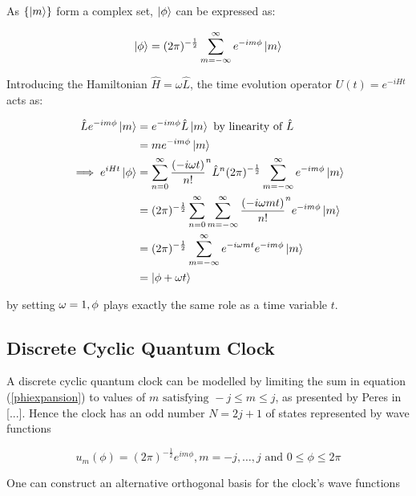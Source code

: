 \documentclass{article}
\begin{document}
\noindent As $\{\ket{m}\}$ form a complex set, $\ket{\phi}$ can be expressed as:

\begin{equation}
	\ket{\phi} = (2\pi)^{-\frac{1}{2}}\sum_{m=-\infty}^{\infty}e^{-im\phi}\ket{m}
	\label{phiexpansion}
\end{equation}

\noindent Introducing the Hamiltonian $\hat{H}=\omega \hat{L}$, the time evolution operator $U(t) = e^{-iHt}$ acts as:

\begin{align}
\hat{L}e^{-im\phi}\ket{m} &= e^{-im\phi}\hat{L}\ket{m} \text{ by linearity of } \hat{L} \\
				  &= me^{-im\phi}\ket{m} \\
\implies e^{iHt}\ket{\phi} &= \sum_{n=0}^{\infty}\frac{(-i\omega t)}{n!}^n \hat{L}^n (2\pi)^{-\frac{1}{2}}\sum_{m=-\infty}^{\infty}e^{-im\phi}\ket{m} \\
			   &= (2\pi)^{-\frac{1}{2}}\sum_{n=0}^{\infty}\sum_{m=-\infty}^{\infty} \frac{(-i\omega mt)}{n!}^n e^{-im\phi} \ket{m} \\
				   &= (2\pi)^{-\frac{1}{2}}\sum_{m=-\infty}^{\infty}e^{-i\omega mt}e^{-im\phi}\ket{m} \\
				   &= \ket{\phi+\omega t}
\end{align}

\noindent by setting $\omega = 1, \space \phi$ plays exactly the same role as a time variable $t$.

\subsection{Discrete Cyclic Quantum Clock}
\label{subsection:dcqc}
A discrete cyclic quantum clock can be modelled by limiting the sum in equation (\ref{phiexpansion}) to values of \linebreak $m \text{ satisfying } -j \leq m \leq j$, as presented by Peres in [...]. Hence the clock has an odd number $N = 2j+1$ of states represented by wave functions

\begin{equation}
	u_m(\phi) = (2\pi)^{-\frac{1}{2}}e^{im\phi}, m = -j,\dots, j \text{ and } 0 \leq \phi \leq 2\pi
\end{equation}

\noindent One can construct an alternative orthogonal basis for the clock's wave functions
\end{document}
